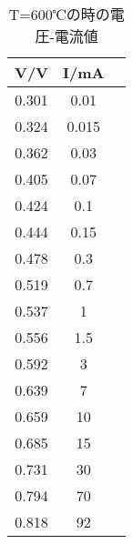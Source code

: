\documentclass[11pt,a4j]{jsarticle}
\begin{document}
 
 \begin{table}[htb]
  \begin{center}
    \caption{T=600℃の時の電圧-電流値}
    \begin{tabular}{ccc} \toprule
V/V	&	I/mA\\ \midrule
0.301	&	0.01\\
0.324	&	0.015\\
0.362	&	0.03\\
0.405	&	0.07\\
0.424	&	0.1\\
0.444	&	0.15\\
0.478	&	0.3\\
0.519	&	0.7\\
0.537	&	1\\
0.556	&	1.5\\
0.592	&	3\\
0.639	&	7\\
0.659	&	10\\
0.685	&	15\\
0.731	&	30\\
0.794	&	70\\
0.818	&	92\\ \bottomrule
    \end{tabular}
    \label{tab:price}
  \end{center}
\end{table}
 
 

 
\end{document}
